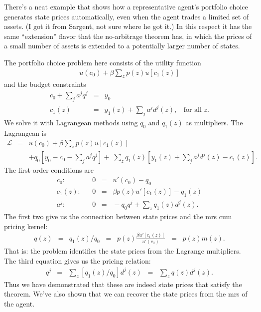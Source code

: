 \documentclass[11pt]{article}
\begin{document}

There's a neat example that shows how a representative agent's portfolio
choice generates state prices automatically,
even when the agent trades a limited set of assets.
(I got it from Sargent, not sure where he got it.)
In this respect it has the same ``extension'' flavor that the no-arbitrage
theorem has, in which the prices of a small number of assets
is extended to a potentially larger number of states.

The portfolio choice problem here consists of the utility function
\begin{eqnarray*}
    u(c_0) + \beta \sum_z p(z) u[c_1(z)]
\end{eqnarray*}
and the budget constraints
\begin{eqnarray*}
    c_0 + \sum_j a^j q^j &=& y_0 \\
    c_1(z)  &=& y_1(z) + \sum_j a^j d^j(z), \;\; \mbox{ for all } z.
\end{eqnarray*}
We solve it with Lagrangean methods using $q_0$ and $q_1(z)$
as multipliers.
The Lagrangean is
\begin{eqnarray*}
    \mathcal{L} &=& u(c_0) + \beta \sum_z p(z) u[c_1(z)] \\
            && + q_0 [ y_0 - c_0 - \sum_j a^j q^j ]
               + \; \sum_z q_1(z) [  y_1(z) + \sum_j a^j d^j(z) -  c_1(z) ] .
\end{eqnarray*}
The first-order conditions are
\begin{eqnarray*}
    c_0: &&     0 \;\;=\;\; u'(c_0) - q_0   \\
    c_1(z): &&  0 \;\;=\;\; \beta p(z) u'[c_1(z)] - q_1(z)  \\
    a^j:  &&    0 \;\;=\;\; - q_0 q^j + \sum_z q_1(z) d^j(z) .
\end{eqnarray*}
The first two give us the connection between state prices
and the mrs cum pricing kernel:
\begin{eqnarray*}
    q(z) &=& q_1(z) / q_0
        \;\;=\;\; p(z) \frac{\beta u'[c_1(z)]}{u'(c_0)}
        \;\;=\;\; p(z) m(z) .
\end{eqnarray*}
That is:  the problem identifies the state prices from the Lagrange multipliers.
The third equation gives us the pricing relation:
\begin{eqnarray*}
    q^j &=& \sum_z [q_1(z)/q_0] d^j(z)
        \;\;=\;\; \sum_z q(z) d^j(z) .
\end{eqnarray*}
Thus we have demonstrated that these are indeed state prices that satisfy the theorem.
We've also shown that we can recover the state prices from the mrs
of the agent.
\end{document}
